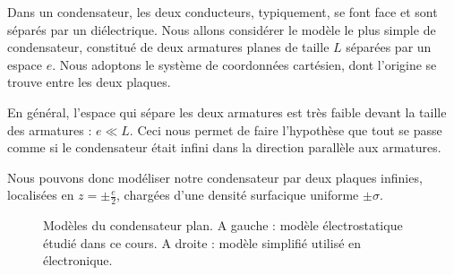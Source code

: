 \documentclass[11pt,fleqn]{book} %
\begin{document}
Dans un condensateur, les deux conducteurs, typiquement, se font face et sont séparés par un diélectrique. Nous allons considérer le modèle le plus simple de condensateur, constitué de deux armatures planes de taille $L$ séparées par un espace $e$. Nous adoptons le système de coordonnées cartésien, dont l'origine se trouve entre les deux plaques.

En général, l'espace qui sépare les deux armatures est très faible devant la taille des armatures : $e \ll L$. Ceci nous permet de faire l'hypothèse que tout se passe comme si le condensateur était infini dans la direction parallèle aux armatures. 

Nous pouvons donc modéliser notre condensateur par deux plaques infinies, localisées en $z = \pm \frac{e}{2}$, chargées d'une densité surfacique uniforme $\pm \sigma$.

\begin{figure}[htbp]
\centering

 \hspace{1cm} 

\caption{Modèles du condensateur plan. A gauche : modèle électrostatique étudié dans ce cours. A droite : modèle simplifié utilisé en électronique.}
\label{fig:condensateur}
\end{figure}
\end{document}

